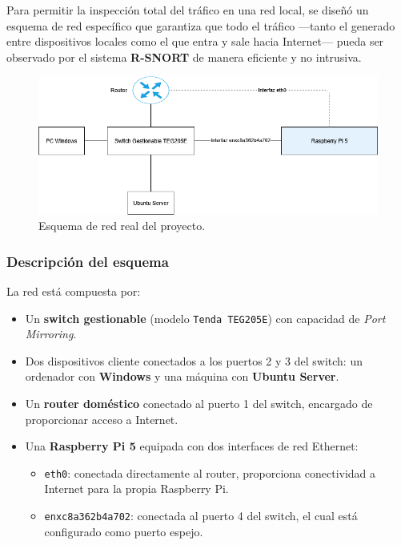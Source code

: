 \documentclass[12pt,a4paper]{report}
\begin{document}
Para permitir la inspección total del tráfico en una red local, se diseñó un esquema de red específico que garantiza que todo el tráfico —tanto el generado entre dispositivos locales como el que entra y sale hacia Internet— pueda ser observado por el sistema \textbf{R-SNORT} de manera eficiente y no intrusiva.

\begin{figure}[H]
	\centering
	\includegraphics[scale=0.6]{script_automatico/network.png}
	\caption{Esquema de red real del proyecto.}
\end{figure}

\subsubsection{Descripción del esquema}

La red está compuesta por:

\begin{itemize}
	\item Un \textbf{switch gestionable} (modelo \texttt{Tenda TEG205E}) con capacidad de \textit{Port Mirroring}.
	\item Dos dispositivos cliente conectados a los puertos 2 y 3 del switch: un ordenador con \textbf{Windows} y una máquina con \textbf{Ubuntu Server}.
	\item Un \textbf{router doméstico} conectado al puerto 1 del switch, encargado de proporcionar acceso a Internet.
	\item Una \textbf{Raspberry Pi 5} equipada con dos interfaces de red Ethernet:
	\begin{itemize}
		\item \texttt{eth0}: conectada directamente al router, proporciona conectividad a Internet para la propia Raspberry Pi.
		\item \texttt{enxc8a362b4a702}: conectada al puerto 4 del switch, el cual está configurado como puerto espejo.
	\end{itemize}
\end{itemize}
\end{document}
